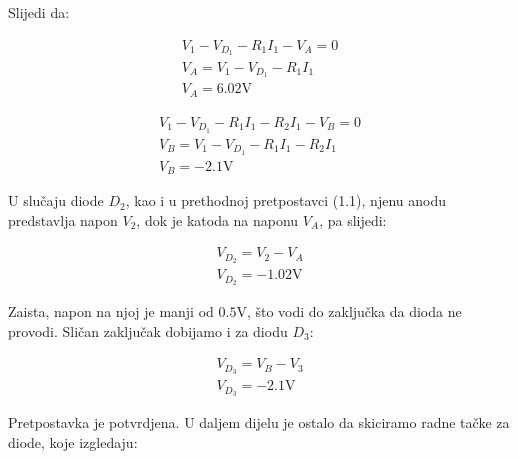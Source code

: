 \documentclass{article}
\begin{document}
        Slijedi da:

        \begin{equation}
            \begin{split}
                V_1 - V_{D_1} - R_1I_1 - V_A = 0 \\
                V_A = V_1 - V_{D_1} - R_1I_1 \\
                V_A = 6.02 \si{\volt}
                \label{eq11}
            \end{split}
        \end{equation}

        \begin{equation}
            \begin{split}
                V_1 - V_{D_1} - R_1I_1 - R_2I_1 - V_B = 0 \\
                V_B = V_1 - V_{D_1} - R_1I_1 - R_2I_1 \\
                V_B = -2.1 \si{\volt}
                \label{eq12}
            \end{split}
        \end{equation}

        U slučaju diode $D_2$, kao i u prethodnoj pretpostavci (1.1), njenu anodu predstavlja napon $V_2$, dok je katoda na naponu $V_A$, pa slijedi:
        
        \begin{equation}
            \begin{split}
                V_{D_2} = V_2 - V_A \\
                V_{D_2} = -1.02 \si{\volt}
            \end{split}
            \label{eq13}
        \end{equation}

        Zaista, napon na njoj je manji od $0.5 \si{\volt}$, što vodi do zaključka da dioda ne provodi.
        Sličan zaključak dobijamo i za diodu $D_3$:

        \begin{equation}
            \begin{split}
                V_{D_3} = V_B - V_3 \\
                V_{D_3} = -2.1 \si{\volt}
            \end{split}
            \label{eq14}
        \end{equation}

        Pretpostavka je potvrdjena. U daljem dijelu je ostalo da skiciramo radne tačke za diode, koje izgledaju:
\end{document}
